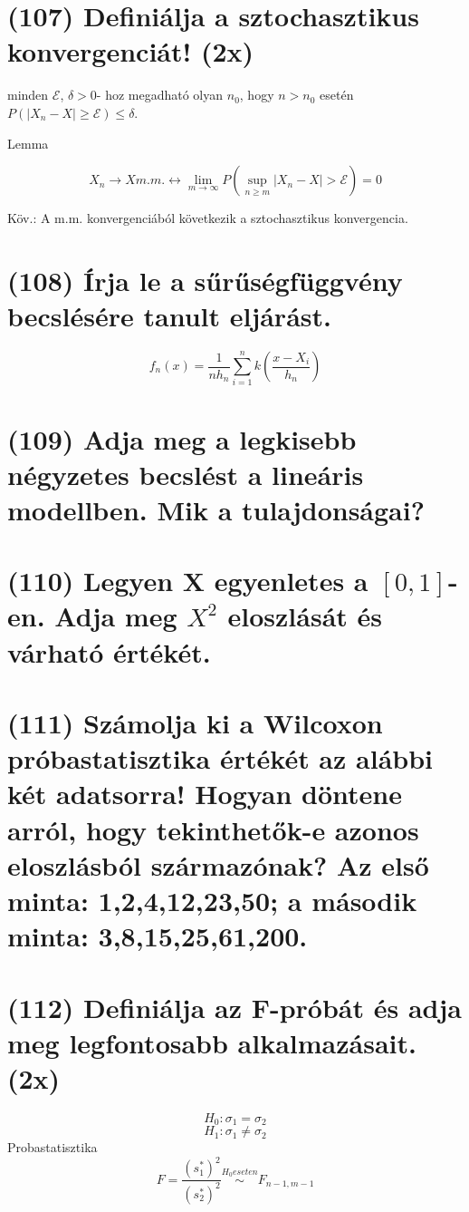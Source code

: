 \documentclass[12p]{article}
\begin{document}
\section{(107) Definiálja a sztochasztikus konvergenciát! (2x)}

 minden $\mathcal{E}$, $\delta>0$-
hoz megadható olyan $n_0$, hogy $n>n_0$ esetén $P(|X_n-X| \geq \mathcal{E}) \leq \delta$.

Lemma

$$X_n \rightarrow X m.m. \leftrightarrow \lim_{m \rightarrow \infty} P(\sup_{n \geq m} |X_n - X| > \mathcal{E}) = 0$$

Köv.: A m.m. konvergenciából következik a
sztochasztikus konvergencia.


\section{(108) Írja le a sűrűségfüggvény becslésére tanult eljárást.}

$$f_n(x) = \frac{1}{nh_n}\sum^n_{i=1}k\left( \frac{x-X_i}{h_n} \right)$$

\section{(109) Adja meg a legkisebb négyzetes becslést a lineáris modellben. Mik a tulajdonságai?}

\section{(110) Legyen X egyenletes a $[0, 1]$-en. Adja meg $X^2$ eloszlását és várható értékét.}

\section{(111) Számolja ki a Wilcoxon próbastatisztika értékét az alábbi két adatsorra! Hogyan döntene arról, hogy tekinthetők-e azonos eloszlásból származónak? Az első minta: 1,2,4,12,23,50;
a második minta: 3,8,15,25,61,200.}

\section{(112) Definiálja az F-próbát és adja meg legfontosabb alkalmazásait. (2x)}

$$H_0: \sigma_1 = \sigma_2$$
$$H_1: \sigma_1 \neq \sigma_2$$
Probastatisztika
$$F= \frac{(s_1^{*})^2}{(s_2^{*})^2} \stackrel{H_0 eseten}{\sim} F_{n-1,m-1}$$
\end{document}
